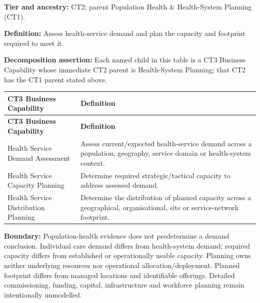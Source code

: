 \textbf{Tier and ancestry:} CT2; parent Population Health \& Health-System Planning (CT1).

\label{rad:business:620}

\textbf{Definition:} Assess health-service demand and plan the capacity and footprint required to meet it.

\label{rad:business:622}

\textbf{Decomposition assertion:} Each named child in this table is a CT3 Business Capability whose immediate CT2 parent is Health-System Planning; that CT2 has the CT1 parent stated above.

\label{rad:business:624}
\begingroup\small\setlength{\TableWidth}{\dimexpr\linewidth-4\tabcolsep-3\arrayrulewidth\relax}
\begin{longtable}{|>{\raggedright\arraybackslash}p{0.35\TableWidth}|>{\raggedright\arraybackslash}p{0.65\TableWidth}|}
\hline\rowcolor{TableHead}\textbf{CT3 Business Capability} & \textbf{Definition}\\\hline\endfirsthead
\hline\rowcolor{TableHead}\textbf{CT3 Business Capability} & \textbf{Definition}\\\hline\endhead
\hline\endfoot
Health Service Demand Assessment & Assess current/\allowbreak{}expected health-service demand across a population, geography, service domain or health-system context.\\\hline
Health Service Capacity Planning & Determine required strategic/\allowbreak{}tactical capacity to address assessed demand.\\\hline
Health Service Distribution Planning & Determine the distribution of planned capacity across a geographical, organisational, site or service-network footprint.\\\hline
\end{longtable}\endgroup
{}\label{rad:business:630}

\textbf{Boundary:} Population-health evidence does not predetermine a demand conclusion. Individual care demand differs from health-system demand; required capacity differs from established or operationally usable capacity. Planning owns neither underlying resources nor operational allocation/\allowbreak{}deployment. Planned footprint differs from managed locations and identifiable offerings. Detailed commissioning, funding, capital, infrastructure and workforce planning remain intentionally unmodelled.

\label{rad:business:632}

